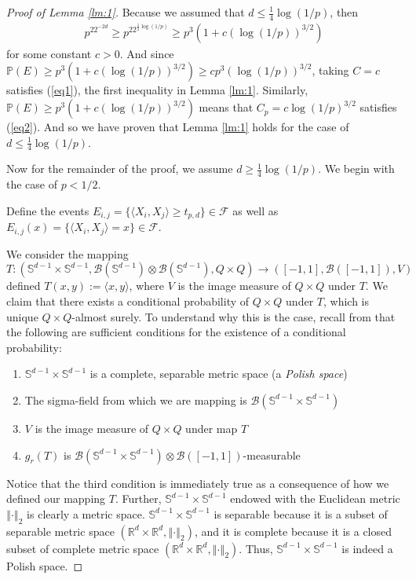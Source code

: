 \documentclass{article}
\begin{document}
\begin{proof}[Proof of Lemma \ref{lm:1}]
Because we assumed that $d \leq \frac{1}{4} \log(1/p)$, then 
\begin{align*}
    p^22^{-2d} \geq p^22^{\frac{1}{2}\log(1/p)} \geq p^3 \left(1 + c\left(\log(1/p) \right)^{3/2} \right)
\end{align*}
for some constant $c > 0$. And since $\mathbb{P}(E) \geq p^3 \left(1 + c\left(\log(1/p) \right)^{3/2} \right) \geq c p^3 \left(\log(1/p) \right)^{3/2}$, taking $C =c$ satisfies (\ref{eq1}), the first inequality in Lemma \ref{lm:1}. Similarly, $\mathbb{P}(E) \geq p^3 \left(1 + c\left(\log(1/p) \right)^{3/2} \right)$ means that $C_p = c \log(1/p)^{3/2}$ satisfies (\ref{eq2}). And so we have proven that Lemma \ref{lm:1} holds for the case of $d \leq \frac{1}{4}\log(1/p)$.

Now for the remainder of the proof, we assume $d \geq \frac{1}{4}\log(1/p)$. We begin with the case of $p < 1/2$. 

Define the events $E_{i, j} = \{\langle X_i, X_j \rangle \geq t_{p, d}\} \in \mathcal{F}$ as well as $E_{i,j}(x) = \{ \langle X_i, X_j \rangle = x\} \in \mathcal{F}$. 

We consider the mapping $T: (\mathbb{S}^{d-1} \times \mathbb{S}^{d-1}, \mathcal{B}(\mathbb{S}^{d-1}) \otimes\mathcal{B}(\mathbb{S}^{d-1}), Q \times Q) \rightarrow ([-1, 1], \mathcal{B}([-1,1]), V)$ defined $T(x,y) := \langle x, y \rangle$, where $V$ is the image measure of $Q \times Q$ under $T$. We claim that there exists a conditional probability of $Q \times Q$ under $T$, which is unique $Q \times Q$-almost surely. To understand why this is the case, recall from \cite{pollard_2001} that the following are sufficient conditions for the existence of a conditional probability:
\begin{enumerate}
    \item $\mathbb{S}^{d-1} \times \mathbb{S}^{d-1}$ is a complete, separable metric space (a \textit{Polish space})
    \item The sigma-field from which we are mapping is $\mathcal{B}(\mathbb{S}^{d-1} \times \mathbb{S}^{d-1})$
    \item $V$ is the image measure of $Q \times Q$ under map $T$
    \item $g_r(T)$ is $\mathcal{B}(\mathbb{S}^{d-1} \times \mathbb{S}^{d-1}) \otimes \mathcal{B}([-1, 1])$-measurable
\end{enumerate}
Notice that the third condition is immediately true as a consequence of how we defined our mapping $T$. Further, $\mathbb{S}^{d-1} \times \mathbb{S}^{d-1}$ endowed with the Euclidean metric $\left \Vert \cdot \right \Vert_2$ is clearly a metric space. $\mathbb{S}^{d-1} \times \mathbb{S}^{d-1}$ is separable because it is a subset of separable metric space $(\mathbb{R}^d \times \mathbb{R}^d, \left \Vert \cdot \right \Vert_2)$, and it is complete because it is a closed subset of complete metric space $(\mathbb{R}^d \times \mathbb{R}^d, \left \Vert \cdot \right \Vert_2)$. Thus, $\mathbb{S}^{d-1} \times \mathbb{S}^{d-1}$ is indeed a Polish space. 


\end{proof}
\end{document}
